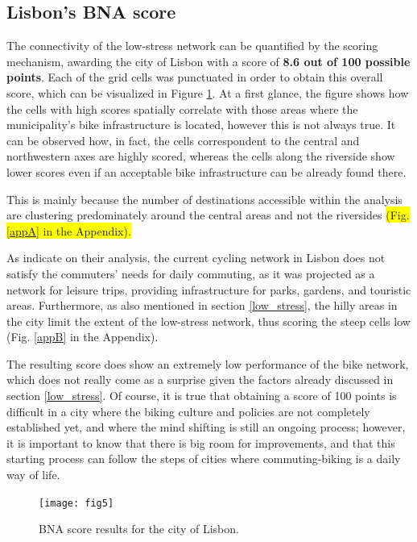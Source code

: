 \documentclass[information,article,submit,moreauthors,Latex,dvi2pdf,10pt,a4paper]{Definitions/mdpi}
\begin{document}
\subsection{Lisbon's BNA score} \label{lisbon_bna}

The connectivity of the low-stress network can be quantified by the scoring mechanism, awarding the city of Lisbon with a score of \textbf{8.6 out of 100 possible points}. Each of the grid cells was punctuated in order to obtain this overall score, which can be visualized in Figure \ref{fig5}. At a first glance, the figure shows how the cells with high scores spatially correlate with those areas where the municipality's bike infrastructure is located, however this is not always true. It can be observed how, in fact, the cells correspondent to the central and northwestern axes are highly scored, whereas the cells along the riverside show lower scores even if an acceptable bike infrastructure can be already found there. 

This is mainly because the number of destinations accessible within the analysis are clustering predominately around the central areas and not the riversides \colorbox{yellow}{(Fig. \ref{appA} in the Appendix).}

\begin{mycolorbox}[colback=yellow]
As \cite{Moura2017} indicate on their analysis, the current cycling network in Lisbon does not satisfy the commuters' needs for daily commuting, as it was projected as a network for leisure trips, providing infrastructure for parks, gardens, and touristic areas. Furthermore, as also mentioned in section \ref{low_stress}, the hilly areas in the city limit the extent of the low-stress network, thus scoring the steep cells low (Fig. \ref{appB} in the Appendix).
\end{mycolorbox}

The resulting score does show an extremely low performance of the bike network, which does not really come as a surprise given the factors already discussed in section \ref{low_stress}. Of course, it is true that obtaining a score of 100 points is difficult in a city where the biking culture and policies are not completely established yet, and where the mind shifting is still an ongoing process; however, it is important to know that there is big room for improvements, and that this starting process can follow the steps of cities where commuting-biking is a daily way of life.

\begin{figure}[ht!]
	\begin{center}
		\texttt{[image: fig5]}
		\caption{BNA score results for the city of Lisbon.}
		\label{fig5}
	\end{center}
\end{figure}
\end{document}
